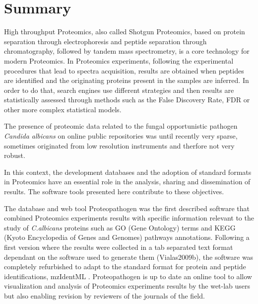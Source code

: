%
%
%
%
%

\chapter{Summary}




High throughput Proteomics, also called Shotgun Proteomics,
based on protein separation through 
electrophoresis and peptide separation through chromatography, followed
by tandem mass spectrometry, is a core technology for modern Proteomics.
In Proteomics experiments, following the experimental procedures that
lead to spectra acquisition, results are obtained when peptides are 
identified and the originating proteins present in the samples are inferred.
In order to do that, search engines use different strategies and then
results are statistically assessed through methods such as the False
Discovery Rate, FDR or other more complex statistical models.

The presence of proteomic data related to the fungal opportunistic 
pathogen \textit{Candida albicans} on online public repositories was
until recently very sparse, sometimes originated from low resolution
instruments and therfore not very robust.

In this context, the development databases and the adoption
of standard formats in Proteomics have an essential role in the analysis,
sharing and dissemination of results. The software tools presented here 
contribute to these objectives.

The database and web tool Proteopathogen was the first described software 
that combined Proteomics experiments results with specific information 
relevant to the study of \textit{C.albicans} proteins such as GO (Gene Ontology)
terms and KEGG (Kyoto Encyclopedia of Genes and Genomes) pathways annotations.
Following a first version where the results were collected
in a tab separated text format dependant on the software used to generate 
them (Vialas2009b), the software was completely refurbished to adapt to
the standard format for protein and peptide identifications, mzIdentML 
\citep{Vialas2015}. Proteopathogen is up to date an online tool to allow
visualization and analysis of Proteomics experiments results by the wet-lab 
users but also enabling revision by reviewers of the journals of the field.

